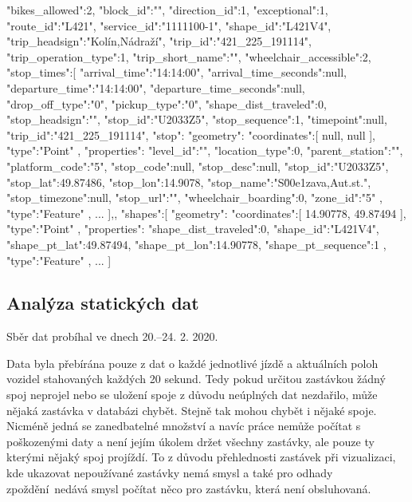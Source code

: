 \begin{code}[frame=none]
"bikes_allowed":2,
"block_id":"",
"direction_id":1,
"exceptional":1,
"route_id":"L421",
"service_id":"1111100-1",
"shape_id":"L421V4",
"trip_headsign":"Kolín,Nádraží",
"trip_id":"421_225_191114",
"trip_operation_type":1,
"trip_short_name":"",
"wheelchair_accessible":2,
"stop_times":[{
  "arrival_time":"14:14:00",
  "arrival_time_seconds":null,
  "departure_time":"14:14:00",
  "departure_time_seconds":null,
  "drop_off_type":"0",
  "pickup_type":"0",
  "shape_dist_traveled":0,
  "stop_headsign":"",
  "stop_id":"U2033Z5",
  "stop_sequence":1,
  "timepoint":null,
  "trip_id":"421_225_191114",
  "stop":{
    "geometry":{
      "coordinates":[
        null,
        null
      ],
      "type":"Point"
    },
    "properties":{
      "level_id":"",
      "location_type":0,
      "parent_station":"",
      "platform_code":"5",
      "stop_code":null,
      "stop_desc":null,
      "stop_id":"U2033Z5",
      "stop_lat":49.87486,
      "stop_lon":14.9078,
      "stop_name":"S\u00e1zava,Aut.st.",
      "stop_timezone":null,
      "stop_url":"",
      "wheelchair_boarding":0,
      "zone_id":"5"
    },
    "type":"Feature"
  },
  ...
],},
"shapes":[{
  "geometry":{
    "coordinates":[
      14.90778,
      49.87494
    ],
    "type":"Point"
  },
  "properties":{
    "shape_dist_traveled":0,
    "shape_id":"L421V4",
    "shape_pt_lat":49.87494,
    "shape_pt_lon":14.90778,
    "shape_pt_sequence":1
  },
  "type":"Feature"
},
...
]

\end{code}

\subsection{Analýza statických dat}

Sběr dat probíhal ve dnech 20.--24. 2. 2020.

\bigbreak

Data byla přebírána pouze z dat o každé jednotlivé jízdě a aktuálních poloh vozidel stahovaných každých 20 sekund. Tedy pokud určitou zastávkou žádný spoj neprojel nebo se uložení spoje z důvodu neúplných dat nezdařilo, může nějaká zastávka v databázi chybět. Stejně tak mohou chybět i nějaké spoje. Nicméně jedná se zanedbatelné množství a navíc práce nemůže počítat s poškozenými daty a není jejím úkolem držet všechny zastávky, ale pouze ty kterými nějaký spoj projíždí. To z důvodu přehlednosti zastávek při vizualizaci, kde ukazovat nepoužívané zastávky nemá smysl a také pro odhady zpoždění nedává smysl počítat něco pro zastávku, která není obsluhovaná.

